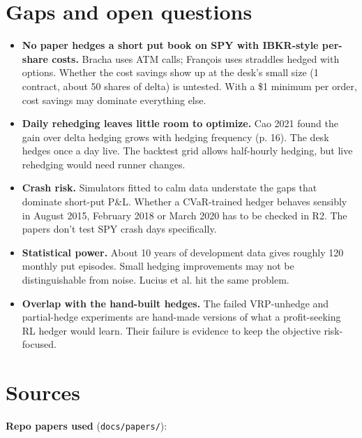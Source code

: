 \documentclass{article}
\begin{document}
\section{Gaps and open questions}

\begin{itemize}

\item \textbf{No paper hedges a short put book on SPY with IBKR-style per-share costs.} Bracha uses ATM calls; François uses straddles hedged with options. Whether the cost savings show up at the desk's small size (1 contract, about 50 shares of delta) is untested. With a \$1 minimum per order, cost savings may dominate everything else.

\item \textbf{Daily rehedging leaves little room to optimize.} Cao 2021 found the gain over delta hedging grows with hedging frequency (p. 16). The desk hedges once a day live. The backtest grid allows half-hourly hedging, but live rehedging would need runner changes.

\item \textbf{Crash risk.} Simulators fitted to calm data understate the gaps that dominate short-put P\&L. Whether a CVaR-trained hedger behaves sensibly in August 2015, February 2018 or March 2020 has to be checked in R2. The papers don't test SPY crash days specifically.

\item \textbf{Statistical power.} About 10 years of development data gives roughly 120 monthly put episodes. Small hedging improvements may not be distinguishable from noise. Lucius et al. hit the same problem.

\item \textbf{Overlap with the hand-built hedges.} The failed VRP-unhedge and partial-hedge experiments are hand-made versions of what a profit-seeking RL hedger would learn. Their failure is evidence to keep the objective risk-focused.

\end{itemize}

\section{Sources}

\textbf{Repo papers used} (\texttt{docs/\allowbreak{}papers/\allowbreak{}}):
\end{document}
